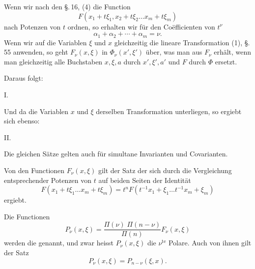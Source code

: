 
Wenn wir nach den \S.\,16, (4) die Function
\[
F(x_1 + t\xi_1, x_2 + t\xi_2 \ldots x_m + t\xi_m)
\]
nach Potenzen von $t$ ordnen, so erhalten wir für den Coëfficienten von $t^\nu$
\[
\alpha_1 + \alpha_2 + \cdots + \alpha_m = \nu.
\]
Wenn wir auf die Variablen $\xi$ und $x$ gleichzeitig die lineare
Transformation (1), \S.\,55 anwenden, so geht $F_\nu(x,\xi)$ in $\Phi_\nu(x',\xi')$
über, was man aus $F_\nu$ erhält, wenn man gleichzeitig alle Buchstaben
$x, \xi, a$ durch $x', \xi', a'$ und $F$ durch $\Phi$ ersetzt.

Daraus folgt:

I. 

Und da die Variablen $x$ und $\xi$ derselben Transformation
unterliegen, so ergiebt sich ebenso:

II. 

Die gleichen Sätze gelten auch für simultane Invarianten
und Covarianten.

Von den Functionen $F_\nu(x,\xi)$ gilt der Satz
der sich durch die Vergleichung entsprechender Potenzen von $t$
auf beiden Seiten der Identität
\[
F(x_1+t\xi_1\ldots x_m+t\xi_m) = t^n F(t^{-1}x_1+\xi_1\ldots t^{-1}x_m+\xi_m)
\]
ergiebt.

Die Functionen
\[
P_\nu(x,\xi) = \frac{\Pi(\nu)\;\Pi(n-\nu)}{\Pi(n)}F_\nu(x,\xi)
\]
werden die  genannt, und zwar
heisst $P_\nu(x,\xi)$ die $\nu^{\mathrm{te}}$ Polare. Auch von ihnen gilt der Satz
\[
P_\nu(x,\xi) = P_{n-\nu}(\xi,x).
\]
